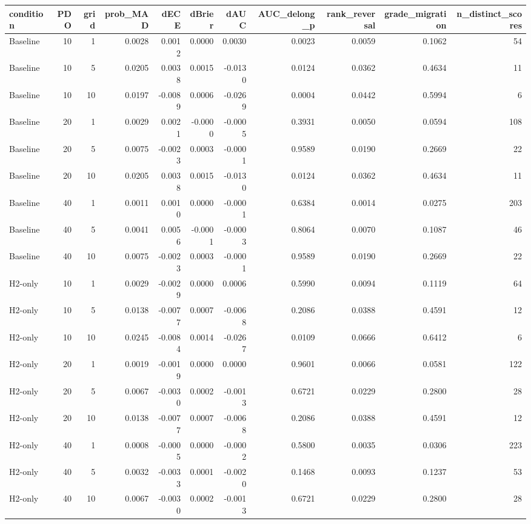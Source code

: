 \begin{tabular}{lrrrrrrrrrr}
\toprule
condition & PDO & grid & prob_MAD & dECE & dBrier & dAUC & AUC_delong_p & rank_reversal & grade_migration & n_distinct_scores \\
\midrule
Baseline & 10 & 1 & 0.0028 & 0.0012 & 0.0000 & 0.0030 & 0.0023 & 0.0059 & 0.1062 & 54 \\
Baseline & 10 & 5 & 0.0205 & 0.0038 & 0.0015 & -0.0130 & 0.0124 & 0.0362 & 0.4634 & 11 \\
Baseline & 10 & 10 & 0.0197 & -0.0089 & 0.0006 & -0.0269 & 0.0004 & 0.0442 & 0.5994 & 6 \\
Baseline & 20 & 1 & 0.0029 & 0.0021 & -0.0000 & -0.0005 & 0.3931 & 0.0050 & 0.0594 & 108 \\
Baseline & 20 & 5 & 0.0075 & -0.0023 & 0.0003 & -0.0001 & 0.9589 & 0.0190 & 0.2669 & 22 \\
Baseline & 20 & 10 & 0.0205 & 0.0038 & 0.0015 & -0.0130 & 0.0124 & 0.0362 & 0.4634 & 11 \\
Baseline & 40 & 1 & 0.0011 & 0.0010 & 0.0000 & -0.0001 & 0.6384 & 0.0014 & 0.0275 & 203 \\
Baseline & 40 & 5 & 0.0041 & 0.0056 & -0.0001 & -0.0003 & 0.8064 & 0.0070 & 0.1087 & 46 \\
Baseline & 40 & 10 & 0.0075 & -0.0023 & 0.0003 & -0.0001 & 0.9589 & 0.0190 & 0.2669 & 22 \\
H2-only & 10 & 1 & 0.0029 & -0.0029 & 0.0000 & 0.0006 & 0.5990 & 0.0094 & 0.1119 & 64 \\
H2-only & 10 & 5 & 0.0138 & -0.0077 & 0.0007 & -0.0068 & 0.2086 & 0.0388 & 0.4591 & 12 \\
H2-only & 10 & 10 & 0.0245 & -0.0084 & 0.0014 & -0.0267 & 0.0109 & 0.0666 & 0.6412 & 6 \\
H2-only & 20 & 1 & 0.0019 & -0.0019 & 0.0000 & 0.0000 & 0.9601 & 0.0066 & 0.0581 & 122 \\
H2-only & 20 & 5 & 0.0067 & -0.0030 & 0.0002 & -0.0013 & 0.6721 & 0.0229 & 0.2800 & 28 \\
H2-only & 20 & 10 & 0.0138 & -0.0077 & 0.0007 & -0.0068 & 0.2086 & 0.0388 & 0.4591 & 12 \\
H2-only & 40 & 1 & 0.0008 & -0.0005 & 0.0000 & -0.0002 & 0.5800 & 0.0035 & 0.0306 & 223 \\
H2-only & 40 & 5 & 0.0032 & -0.0033 & 0.0001 & -0.0020 & 0.1468 & 0.0093 & 0.1237 & 53 \\
H2-only & 40 & 10 & 0.0067 & -0.0030 & 0.0002 & -0.0013 & 0.6721 & 0.0229 & 0.2800 & 28 \\

\end{tabular}
